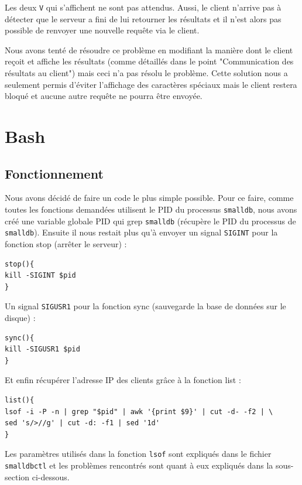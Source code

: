 \documentclass[utf8]{article}
\begin{document}
Les deux \texttt{V} qui s'affichent ne sont pas attendus. Aussi, le client n'arrive pas à détecter que le serveur a fini de lui retourner les résultats et il n'est alors pas possible de renvoyer une nouvelle requête via le client.

Nous avons tenté de résoudre ce problème en modifiant la manière dont le client reçoit et affiche les résultats (comme détaillés dans le point "Communication des résultats au client") mais ceci n'a pas résolu le problème. Cette solution nous a seulement permis d'éviter l'affichage des caractères spéciaux mais le client restera bloqué et aucune autre requête ne pourra être envoyée.


\section{Bash}

\subsection{Fonctionnement}

Nous avons décidé de faire un code le plus simple possible. Pour ce faire, comme toutes les fonctions demandées utilisent le PID du processus \texttt{smalldb}, nous avons créé une variable globale PID qui grep \texttt{smalldb} (récupère le PID du processus de \texttt{smalldb}). Ensuite il nous restait plus qu'à envoyer un signal \texttt{SIGINT} pour la fonction stop (arrêter le serveur) :

\begin{lstlisting}
stop(){
kill -SIGINT $pid
}
\end{lstlisting}

Un signal \texttt{SIGUSR1} pour la fonction sync (sauvegarde la base de données sur le disque) :

\begin{lstlisting}
sync(){
kill -SIGUSR1 $pid
}
\end{lstlisting}

Et enfin récupérer l'adresse IP des clients grâce à la fonction list : 

\begin{lstlisting}
list(){
lsof -i -P -n | grep "$pid" | awk '{print $9}' | cut -d- -f2 | \
sed 's/>//g' | cut -d: -f1 | sed '1d'
}
\end{lstlisting}

Les paramètres utilisés dans la fonction \texttt{lsof} sont expliqués dans le fichier \texttt{smalldbctl} et les problèmes rencontrés sont quant à eux expliqués dans la sous-section ci-dessous.
\end{document}
